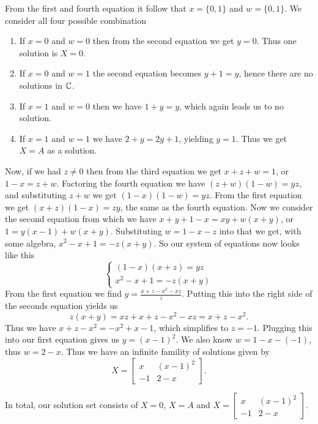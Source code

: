 \documentclass{article}
\begin{document}
\begin{solution}
  From the first and fourth equation it follow that $x = \{0, 1\}$ and $w = \{0, 1\}$.
  We consider all four possible combination
  \begin{enumerate}
    \item If $x = 0$ and $w = 0$ then from the second equation we get $y = 0$.
      Thus one solution is $X = 0$.
    \item If $x = 0$ and $w = 1$ the second equation becomes $y + 1 = y$, hence there are no solutions in $\mathbb{C}$.
    \item If $x = 1$ and $w = 0$ then we have $1 + y = y$, which again leads us to no solution.
    \item If $x = 1$ and $w = 1$ we have $2 + y = 2y + 1$, yielding $y = 1$.
      Thus we get $X = A$ as a solution.
  \end{enumerate}
  Now, if we had $z \neq 0$ then from the third equation we get $x + z + w = 1$, or $1 - x = z + w$.
  Factoring the fourth equation we have $(z + w)(1 - w) = yz$, and substituting $z + w$ we get $(1 - x)(1 - w) = yz$.
  From the first equation we get $(x + z)(1 - x) = zy$, the same as the fourth equation.
  Now we consider the second equation from which we have $x + y + 1 - x = xy + w(x + y)$, or $1 = y(x - 1) + w(x + y)$.
  Substituting $w = 1 - x - z$ into that we get, with some algebra, $x^2 - x + 1 = -z(x + y)$.
  So our system of equations now looks like this
  \[\begin{cases} (1 - x)(x + z) = yz\\ x^2 - x + 1 = -z(x + y) \end{cases}\]
  From the first equation we find $y = \frac{x + z - x^2 -xz}{z}$.
  Putting this into the right side of the seconds equation yields us
  \[z(x + y) = xz + x + z - x^2 - xz = x + z - x^2.\]
  Thus we have $x + z - x^2 = -x^2 + x - 1$, which simplifies to $z = -1$.
  Plugging this into our first equation gives us $y = (x - 1)^2$.
  We also know $w = 1 - x - (- 1)$, thus $w = 2 - x$.
  Thus we have an infinite famility of solutions given by
  \[X = \begin{bmatrix} x & (x - 1)^2\\ - 1 & 2 - x \end{bmatrix}.\]

  In total, our solution set consists of $X = 0$, $X = A$ and $X = \begin{bmatrix} x & (x - 1)^2\\ - 1 & 2 - x \end{bmatrix}$.
\end{solution}
\end{document}
